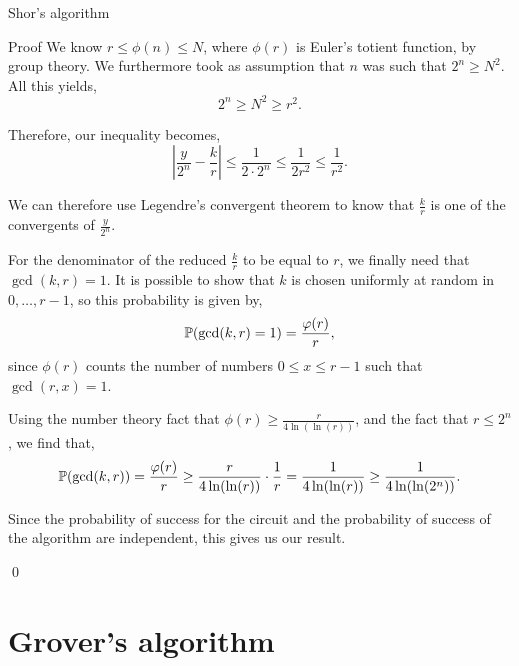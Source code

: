 \documentclass[a4paper]{article}
\begin{document}
\begin{parag}{Shor's algorithm}
\begin{subparag}{Proof}
        We know $r \leq \phi\left(n\right) \leq N$, where $\phi\left(r\right)$ is Euler's totient function, by group theory. We furthermore took as assumption that $n$ was such that $2^n \geq N^2$. All this yields, 
        \[2^n \geq N^2 \geq r^2.\]

        Therefore, our inequality becomes, 
        \[\left|\frac{y}{2^n} - \frac{k}{r}\right| \leq \frac{1}{2\cdot 2^n} \leq \frac{1}{2r^2} \leq \frac{1}{r^2}.\]

        We can therefore use Legendre's convergent theorem to know that $\frac{k}{r}$ is one of the convergents of $\frac{y}{2^n}$. 

        For the denominator of the reduced $\frac{k}{r}$ to be equal to $r$, we finally need that $\gcd\left(k, r\right) = 1$. It is possible to show that $k$ is chosen uniformly at random in $0, \ldots, r-1$, so this probability is given by, 
        \[\prob\left(\gcd\left(k, r\right) = 1\right) = \frac{\phi\left(r\right)}{r},\]
        since $\phi\left(r\right)$ counts the number of numbers $0 \leq x \leq r - 1$ such that $\gcd\left(r, x\right) = 1$.

        Using the number theory fact that $\phi\left(r\right) \geq \frac{r}{4 \ln\left(\ln\left(r\right)\right)}$, and the fact that $r \leq 2^n$, we find that, 
        \[\prob\left(\gcd\left(k, r\right)\right) = \frac{\phi\left(r\right)}{r} \geq \frac{r}{4 \ln\left(\ln\left(r\right)\right)} \cdot \frac{1}{r} = \frac{1}{4 \ln\left(\ln\left(r\right)\right)} \geq \frac{1}{4 \ln\left(\ln\left(2^n\right)\right)}.\]

        Since the probability of success for the circuit and the probability of success of the algorithm are independent, this gives us our result.

        \qed
    \end{subparag}
\end{parag}


\section{Grover's algorithm}
\end{document}
